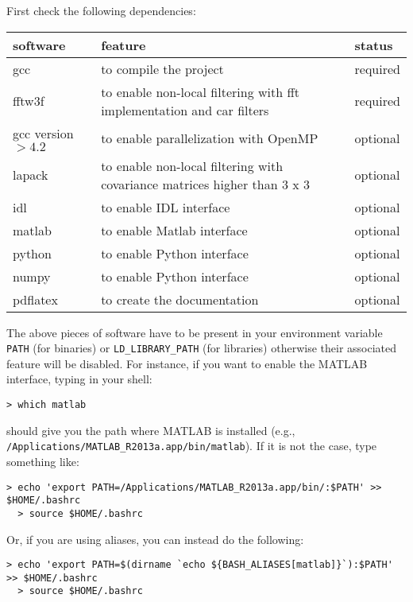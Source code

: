 \documentclass[10pt,french,english,a4paper]{article}
\begin{document}
First check the following dependencies:
\begin{center}
  \begin{tabular}{|l|l|l|}
    \hline
    software		& feature & status\\
    \hline
    gcc			& to compile the project & required\\
    fftw3f		& to enable non-local filtering with fft implementation and car filters & required\\
    gcc version $> 4.2$   & to enable parallelization with OpenMP & optional\\
    lapack		& to enable non-local filtering with covariance matrices higher than 3 x 3 & optional\\
    idl			& to enable IDL interface & optional\\
    matlab		& to enable Matlab interface & optional\\
    python		& to enable Python interface & optional\\
    numpy		& to enable Python interface & optional\\
    pdflatex		& to create the documentation & optional\\
    \hline
  \end{tabular}
\end{center}
The above pieces of software have to be present in your environment
variable \texttt{PATH} (for binaries) or \texttt{LD\_LIBRARY\_PATH} (for libraries) otherwise
their associated feature will be disabled. For instance, if you want to enable the MATLAB
interface, typing in your shell:
\begin{Verbatim}[frame=single]
  > which matlab
\end{Verbatim}
should give you the path where MATLAB is installed (e.g.,
\texttt{/Applications/MATLAB\_R2013a.app/bin/matlab}). If it is not the case,
type something like:
\begin{Verbatim}[frame=single]
  > echo 'export PATH=/Applications/MATLAB_R2013a.app/bin/:$PATH' >> $HOME/.bashrc
  > source $HOME/.bashrc
\end{Verbatim}
Or, if you are using aliases, you can instead do the following:
\begin{Verbatim}[frame=single]
  > echo 'export PATH=$(dirname `echo ${BASH_ALIASES[matlab]}`):$PATH' >> $HOME/.bashrc
  > source $HOME/.bashrc
\end{Verbatim}
\end{document}
